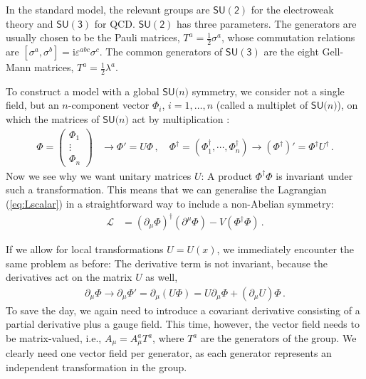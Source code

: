 \documentclass[12pt]{report}
\renewcommand{\L}{\ensuremath{\mathscr{L}}}
\newcommand{\sun}{\ensuremath{\mathsf{SU(}n\mathsf{)}}}
\newcommand{\sutwo}{\ensuremath{\mathsf{SU(2)}}}
\newcommand{\suthree}{\ensuremath{\mathsf{SU(3)}}}
\renewcommand{\i}{\ensuremath{\text{i}}}
\newcommand{\2}{\ensuremath{\sqrt{2}\,}}
\renewcommand{\L}{\ensuremath{\mathscr{L}}}
\begin{document}
{      In the standard model, the relevant groups are $\sutwo$ for the electroweak theory and
      $\suthree$ for QCD. $\sutwo$ has three parameters. The generators are usually
      chosen to be the Pauli matrices,
      $T^a=\frac{1}{2}\sigma^a$, whose commutation relations are 
      $\left[\sigma^a,\sigma^b\right]=\i \varepsilon^{abc}\sigma^c$. The common generators of
      $\suthree$ are the eight Gell-Mann matrices,
      $T^a=\frac{1}{2}\lambda^a$.
      
      To construct a model with a global $\sun$ symmetry, we consider not a single
      field, but an $n$-component vector $\Phi_i$, $i=1,\ldots,n$ (called a multiplet of $\sun$),
      on which the matrices of $\sun$ act by multiplication :
      \begin{align}
        \Phi=
        \begin{pmatrix}
          \Phi_1\\ \vdots \\\Phi_n
        \end{pmatrix}
        &\longrightarrow \Phi' = U \Phi\,, \quad 
        \Phi^\dagger=\left(\Phi_1^\dagger,\cdots,\Phi_n^\dagger\right) \longrightarrow
        \left(\Phi^\dagger\right)'=\Phi^\dagger U^\dagger \,.
      \end{align}
      Now we see why we want unitary matrices $U$: A product $\Phi^\dagger\Phi$ is
      invariant under such a transformation. This means that we can generalise the Lagrangian
      (\ref{eq:Lscalar}) in a straightforward way to include a non-Abelian symmetry:
      \begin{align}
        \L&= \left(\partial_\mu \Phi\right)^\dagger\!\left(\partial^\mu \Phi\right)
        -V\left(\Phi^\dagger\Phi\right) \,.
      \end{align}
      
      If we allow for local transformations $U=U(x)$, we immediately encounter the same problem as
      before: The derivative term is not invariant, because the derivatives act on the matrix $U$
      as well,
      \begin{align}
        \partial_\mu \Phi \to \partial_\mu\Phi' = \partial_\mu\left(U\Phi\right)=U\partial_\mu \Phi
        +\left(\partial_\mu U\right) \Phi\,.
      \end{align}
      To save the day, we again need to introduce a covariant derivative consisting of a partial
      derivative plus a gauge field.  This time, however, the
      vector field needs to be matrix-valued, i.e., $A_\mu = A_\mu^a T^a$, where $T^a$ are the
      generators of the group. We clearly need one vector field per
      generator, as each generator represents an independent transformation in the group. 
        
}
\end{document}
